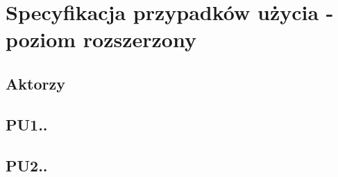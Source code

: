 \section{Specyfikacja przypadków użycia - poziom rozszerzony}

\subsection{Aktorzy}
\subsection{PU1..}
\subsection{PU2..}
